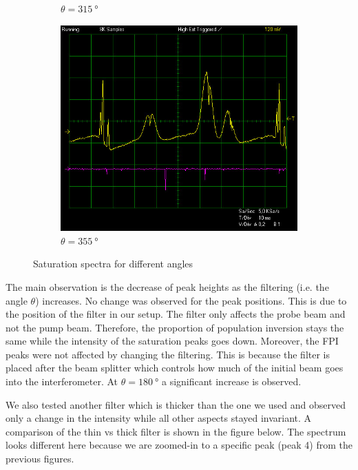 \documentclass{article}
\begin{document}
\begin{figure}[h]
\begin{subfigure}[b]{0.3\textwidth}
        \caption{$\theta = \SI{315}{\degree}$}
        \label{fig:figure315}
    \end{subfigure}
    \begin{subfigure}[b]{0.3\textwidth}
        \centering
        \includegraphics[width=\linewidth]{Figures/3/355deg.jpg}
        \caption{$\theta = \SI{355}{\degree}$}
        \label{fig:figure355}
    \end{subfigure}
    \caption{Saturation spectra for different angles}
    \label{fig:subfigures}
\end{figure}

The main observation is the decrease of peak heights as the filtering (i.e. the angle $\theta$) increases. No change was observed for the peak positions. This is due to the position of the filter in our setup. The filter only affects the probe beam and not the pump beam. Therefore, the proportion of population inversion stays the same while the intensity of the saturation peaks goes down. Moreover, the FPI peaks were not affected by changing the filtering. This is because the filter is placed after the beam splitter which controls how much of the initial beam goes into the interferometer. At $\theta=\SI{180}{\degree}$ a significant increase is observed. 

We also tested another filter which is thicker than the one we used and observed only a change in the intensity while all other aspects stayed invariant. A comparison of the thin vs thick filter is shown in the figure below. The spectrum looks different here because we are zoomed-in to a specific peak (peak 4) from the previous figures. 
\end{document}
